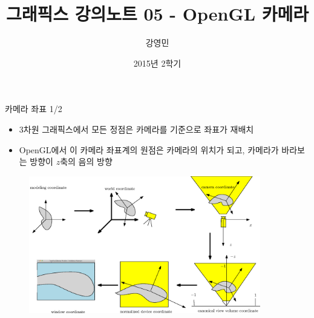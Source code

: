 \documentclass{beamer}
\title[3D 그래픽스 프로그래밍]{그래픽스 강의노트 05 - OpenGL 카메라}
\author{강영민}
\institute{동명대학교}
\date{2015년 2학기}
\begin{document}
\begin{frame}
  \titlepage
\end{frame}




%


\begin{frame}{카메라 좌표 1/2}

\begin{itemize}
\item 3차원 그래픽스에서 모든 정점은 카메라를 기준으로 좌표가 재배치
\item OpenGL에서 이 카메라 좌표계의 원점은 카메라의 위치가 되고, 카메라가 바라보는 방향이 $z$축의 음의 방향
\end{itemize}

\begin{figure}
    \includegraphics[height=6cm]{OGL_camera/coordinatesInPipeline.eps}
\end{figure}

\end{frame}
\end{document}

